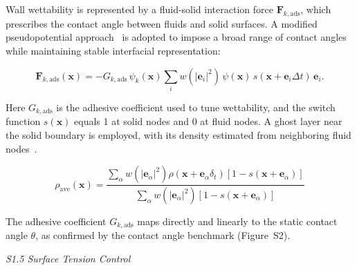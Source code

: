 \documentclass[draft,wrr]{agutexSI2019}
\begin{document}
\begin{article}
Wall wettability is represented by a fluid-solid interaction force
$\mathbf{F}_{k,\mathrm{ads}}$, which prescribes the contact angle between
fluids and solid surfaces. A modified pseudopotential approach~\cite{yang_improved_2021}
is adopted to impose a broad range of contact angles while maintaining stable
interfacial representation:
\begin{linenomath*}
\begin{equation}
\label{eq:force_wettability}
\mathbf{F}_{k,\mathrm{ads}}(\mathbf{x})
=
-
G_{k,\mathrm{ads}}
\,
\psi_k(\mathbf{x})
\sum_i
w\!\left(|\mathbf{e}_i|^2\right)
\,
\psi(\mathbf{x})
\,
s(\mathbf{x}+\mathbf{e}_i \Delta t)
\,
\mathbf{e}_i .
\end{equation}
\end{linenomath*}
Here $G_{k,\mathrm{ads}}$ is the adhesive coefficient used to tune wettability,
and the switch function $s(\mathbf{x})$ equals 1 at solid nodes and 0 at fluid
nodes. A ghost layer near the solid boundary is employed, with its density
estimated from neighboring fluid nodes~\cite{yang_improved_2021,li_implementation_2019}.
 \begin{linenomath*}
\begin{equation}
\label{eq:average-density}
\rho_{\mathrm{ave}}(\mathbf{x}) = \frac{\displaystyle \sum_{\alpha}
w(|\mathbf{e}_{\alpha}|^2) \rho(\mathbf{x} + \mathbf{e}_{\alpha} \delta_t)
[1 - s(\mathbf{x} + \mathbf{e}_{\alpha})]} {\displaystyle \sum_{\alpha}
w(|\mathbf{e}_{\alpha}|^2) [1 - s(\mathbf{x} + \mathbf{e}_{\alpha})]}
\end{equation}
\end{linenomath*}
The adhesive coefficient $G_{k,\mathrm{ads}}$
maps directly and linearly to the static contact angle $\theta$, as confirmed by
the contact angle benchmark (Figure~S2).


\noindent\textit{S1.5 Surface Tension Control}


\end{article}
\end{document}
